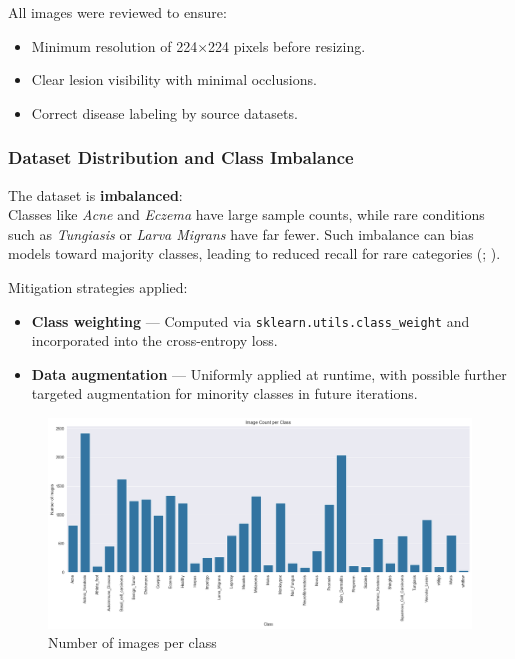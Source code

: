 \documentclass[
  12pt,
  oneside]{article}
\providecommand{\tightlist}{%
  \setlength{\itemsep}{0pt}\setlength{\parskip}{0pt}}
\begin{document}
All images were reviewed to ensure:

\begin{itemize}
\tightlist
\item
  Minimum resolution of 224×224 pixels before resizing.
\item
  Clear lesion visibility with minimal occlusions.
\item
  Correct disease labeling by source datasets.
\end{itemize}

\subsubsection{Dataset Distribution and Class
Imbalance}\label{dataset-distribution-and-class-imbalance}

The dataset is \textbf{imbalanced}:\\
Classes like \emph{Acne} and \emph{Eczema} have large sample counts,
while rare conditions such as \emph{Tungiasis} or \emph{Larva Migrans}
have far fewer. Such imbalance can bias models toward majority classes,
leading to reduced recall for rare categories
(;
).

Mitigation strategies applied:

\begin{itemize}
\tightlist
\item
  \textbf{Class weighting} --- Computed via
  \texttt{sklearn.utils.class\_weight} and incorporated into the
  cross-entropy loss.
\item
  \textbf{Data augmentation} --- Uniformly applied at runtime, with
  possible further targeted augmentation for minority classes in future
  iterations.
\end{itemize}

\begin{figure}

{\centering \includegraphics[width=1\linewidth]{images_per_class} 

}

\caption{Number of images per class}\label{fig:unnamed-chunk-1}
\end{figure}
\end{document}
